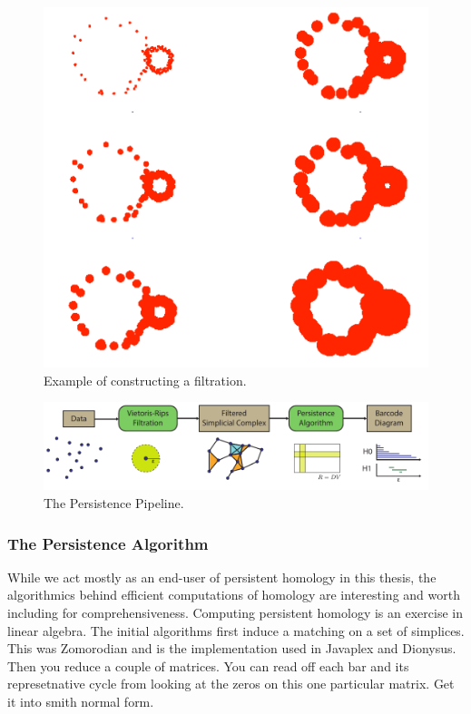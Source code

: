 \begin{figure}
\centering
\includegraphics[]{./fig/LESNICK_ExpandingBalls.pdf}
\caption[A filtration]{Example of constructing a filtration.}
\label{background:fig:exanding balls}
\end{figure}

\begin{figure}
\centering
\includegraphics[]{./fig/persistence_pipeline.pdf}
\caption[The Persistence Pipeline]{The Persistence Pipeline.}
\label{background:fig:persistence_pipeline}
\end{figure}

\subsubsection{The Persistence Algorithm}
\label{subsubsec:ph_algorithm}

While we act mostly as an end-user of persistent homology in this thesis, the algorithmics behind efficient computations of homology are interesting and worth including for comprehensiveness.
Computing persistent homology is an exercise in linear algebra.
The initial algorithms first induce a matching on a set of simplices.
This was Zomorodian and is the implementation used in Javaplex and Dionysus.
Then you reduce a couple of matrices.
You can read off each bar and its represetnative cycle from looking at the zeros on this one particular matrix.
Get it into smith normal form.

